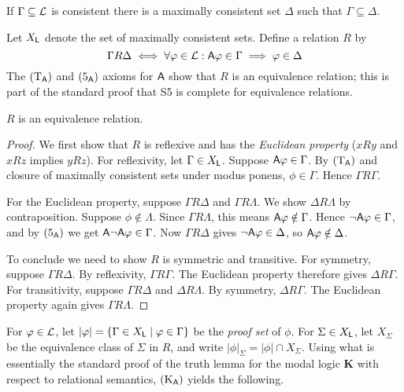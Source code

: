 \begin{lemma}
\label{exp_lemma_lindenbaum}
    If $\Gamma \subseteq \mathcal{L}$ is consistent there is a maximally consistent set
    $\Delta$ such that $\Gamma \subseteq \Delta$.
\end{lemma}

Let $X_{\mathsf{L}}$ denote the set of maximally consistent sets. Define a relation
$R$ by
\[
    \Gamma R \Delta
    \iff
    \forall \varphi \in \mathcal{L}:
     \mathsf{A}\varphi \in \Gamma \implies \varphi \in \Delta
\]
The $(\text{T}_{\mathsf{A}})$ and $(\text{5}_{\mathsf{A}})$ axioms for $\mathsf{A}$ show that $R$ is an equivalence
relation; this is part of the standard proof that S5 is complete for
equivalence relations.

\begin{lemma}
\label{exp_lemma_r_equiv_reln}
    $R$ is an equivalence relation.
\end{lemma}

\begin{proof}

    We first show that $R$ is reflexive and has the \emph{Euclidean property}
    ($xRy$ and $xRz$ implies $yRz$). For reflexivity, let $\Gamma \in X_{\mathsf{L}}$.
    Suppose $\mathsf{A}\varphi \in \Gamma$. By $(\text{T}_{\mathsf{A}})$ and closure of maximally
    consistent sets under modus ponens, $\phi \in \Gamma$. Hence $\Gamma R
    \Gamma$.

    For the Euclidean property, suppose $\Gamma R \Delta$ and $\Gamma R
    \Lambda$. We show $\Delta R \Lambda$ by contraposition. Suppose $\phi
    \notin \Lambda$.  Since $\Gamma R \Lambda$, this means $\mathsf{A}\varphi \notin
    \Gamma$. Hence $\neg\mathsf{A}\varphi \in \Gamma$, and by $(\text{5}_{\mathsf{A}})$ we get
    $\mathsf{A}\neg\mathsf{A}\varphi \in \Gamma$. Now $\Gamma R \Delta$ gives $\neg\mathsf{A}\varphi \in
    \Delta$, so $\mathsf{A}\varphi \notin \Delta$.

    To conclude we need to show $R$ is symmetric and transitive.  For symmetry,
    suppose $\Gamma R \Delta$. By reflexivity, $\Gamma R \Gamma$. The Euclidean
    property therefore gives $\Delta R \Gamma$. For transitivity, suppose
    $\Gamma R \Delta$ and $\Delta R \Lambda$. By symmetry, $\Delta R \Gamma$.
    The Euclidean property again gives $\Gamma R \Lambda$.
\end{proof}

For $\varphi \in \mathcal{L}$, let $|\varphi| = \{\Gamma \in X_{\mathsf{L}} \mid \varphi \in \Gamma\}$
be the \emph{proof set} of $\phi$. For $\Sigma \in X_{\mathsf{L}}$, let $X_\Sigma$ be
the equivalence class of $\Sigma$ in $R$, and write $|\phi|_\Sigma = |\phi|
\cap X_\Sigma$.
%
Using what is essentially the standard proof of the truth lemma for the modal
logic \textbf{K} with respect to relational semantics, $(\text{K}_{\mathsf{A}})$ yields the
following.

